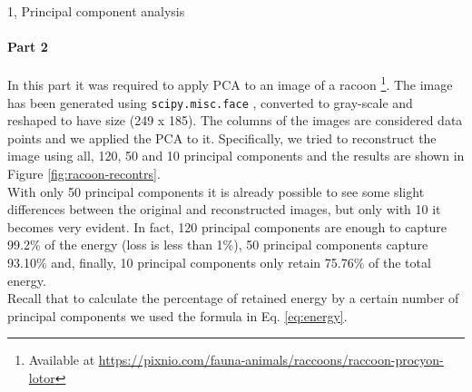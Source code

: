 \documentclass[10pt,a4paper]{article}
\begin{document}
\begin{task}{1, Principal component analysis}
\paragraph{Part 2}
In this part it was required to apply PCA to an image of a racoon
\footnote{Available at \url{https://pixnio.com/fauna-animals/raccoons/raccoon-procyon-lotor}}.
The image has been generated using \texttt{scipy.misc.face} \cite{scipy-face}, converted to gray-scale and reshaped to have size (249 x 185).
The columns of the images are considered data points and we applied the PCA to it.
Specifically, we tried to reconstruct the image using all, 120, 50 and 10 principal components and the results are shown in Figure \ref{fig:racoon-recontrs}.\\
With only 50 principal components it is already possible to see some slight differences between the original and reconstructed images, but only with 10 it becomes very evident.
In fact, 120 principal components are enough to capture 99.2\% of the energy (loss is less than 1\%), 50 principal components capture 93.10\% and, finally, 10 principal components only retain 75.76\% of the total energy.\\
Recall that to calculate the percentage of retained energy by a certain number of principal components we used the formula in Eq. \ref{eq:energy}.


\end{task}
\end{document}
